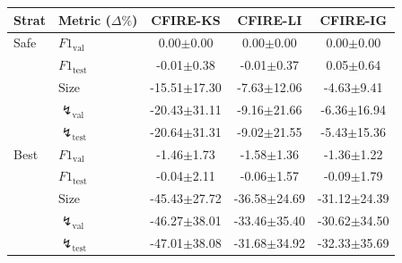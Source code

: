 \begin{tabular}{llccc}
\toprule
Strat & Metric ($\Delta\%$) & CFIRE-KS & CFIRE-LI & CFIRE-IG \\
\midrule
Safe & $F1_{\mathrm{val}}$ & 0.00{\scriptsize$\pm$0.00} & 0.00{\scriptsize$\pm$0.00} & 0.00{\scriptsize$\pm$0.00} \\
 & $F1_{\mathrm{test}}$ & -0.01{\scriptsize$\pm$0.38} & -0.01{\scriptsize$\pm$0.37} & 0.05{\scriptsize$\pm$0.64} \\
 & $\mathrm{Size}$ & -15.51{\scriptsize$\pm$17.30} & -7.63{\scriptsize$\pm$12.06} & -4.63{\scriptsize$\pm$9.41} \\
 & $\lightning_{\text{val}}$ & -20.43{\scriptsize$\pm$31.11} & -9.16{\scriptsize$\pm$21.66} & -6.36{\scriptsize$\pm$16.94} \\
 & $\lightning_{\text{test}}$ & -20.64{\scriptsize$\pm$31.31} & -9.02{\scriptsize$\pm$21.55} & -5.43{\scriptsize$\pm$15.36} \\
Best & $F1_{\mathrm{val}}$ & -1.46{\scriptsize$\pm$1.73} & -1.58{\scriptsize$\pm$1.36} & -1.36{\scriptsize$\pm$1.22} \\
 & $F1_{\mathrm{test}}$ & -0.04{\scriptsize$\pm$2.11} & -0.06{\scriptsize$\pm$1.57} & -0.09{\scriptsize$\pm$1.79} \\
 & $\mathrm{Size}$ & -45.43{\scriptsize$\pm$27.72} & -36.58{\scriptsize$\pm$24.69} & -31.12{\scriptsize$\pm$24.39} \\
 & $\lightning_{\text{val}}$ & -46.27{\scriptsize$\pm$38.01} & -33.46{\scriptsize$\pm$35.40} & -30.62{\scriptsize$\pm$34.50} \\
 & $\lightning_{\text{test}}$ & -47.01{\scriptsize$\pm$38.08} & -31.68{\scriptsize$\pm$34.92} & -32.33{\scriptsize$\pm$35.69} \\
\bottomrule
\end{tabular}
